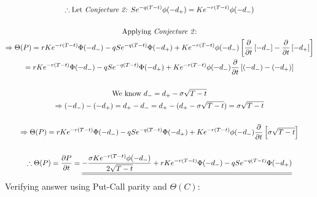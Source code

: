 \documentclass[letterpaper,10pt]{article}
\newcommand{\doubleu}[1]{\underline{\underline{#1}}}
\newcommand{\partiald}[2]{\frac{\partial #1}{\partial #2}}
\begin{document}
\begin{gather*}
				\therefore \text{Let \textit{Conjecture 2:} } Se^{-q(T-t)} \phi(-d_{+}) = Ke^{-r(T-t)}\phi(-d_{-}) \\
				\\
				\text{Applying \textit{Conjecture 2}:} \\
				\Rightarrow \Theta(P) = rKe^{-r(T-t)} \Phi(-d_-) - qSe^{-q(T-t)}\Phi(-d_+) + Ke^{-r(T-t)}\phi(-d_-)\left[ \partiald{}{t}\left[-d_-\right] - \partiald{}{t}\left[ -d_+ \right] \right] \\
				= rKe^{-r(T-t)} \Phi(-d_-) - qSe^{-q(T-t)}\Phi(-d_+) + Ke^{-r(T-t)}\phi(-d_-)\partiald{}{t}\left[ (-d_-) - (-d_+) \right] \\
				\\
				\text{We know } d_- = d_+ - \sigma \sqrt{T-t} \\
				\Rightarrow (-d_-) - (-d_+) = d_+ - d_- = d_+ - (d_+ - \sigma \sqrt{T-t}) = \sigma\sqrt{T-t} \\
				\\
				\Rightarrow \Theta(P) = rKe^{-r(T-t)} \Phi(-d_-) - qSe^{-q(T-t)}\Phi(-d_+) + Ke^{-r(T-t)}\phi(-d_-)\partiald{}{t}\left[ \sigma \sqrt{T-t} \right] \\
				\\
				\therefore \Theta(P) = \partiald{P}{t} = \doubleu{- \frac{\sigma K e^{-r(T-t)} \phi(-d_-)}{2\sqrt{T-t}} + rKe^{-r(T-t)} \Phi(-d_-) - qSe^{-q(T-t)}\Phi(-d_+)}
				\\
			\end{gather*}
			Verifying answer using Put-Call parity and $\Theta(C)$:
\end{document}
